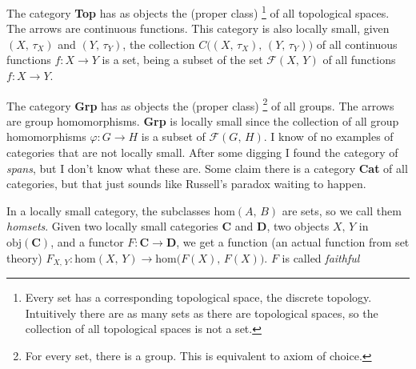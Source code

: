 \documentclass{article}
\theoremstyle{plain}
\theoremstyle{normal}
\newenvironment{example}{%
    \pushQED{\qed}\renewcommand{\qedsymbol}{$\blacksquare$}\examplex%
}{%
    \popQED\endexamplex%
}
\begin{document}
            \begin{example}
                The category \textbf{Top} has as objects the (proper class)%
                \footnote{%
                    Every set has a corresponding topological space, the
                    discrete topology. Intuitively there are as many sets as there
                    are topological spaces, so the collection of all topological
                    spaces is not a set.%
                }
                of all topological spaces. The arrows are continuous functions.
                This category is also locally small, given $(X,\,\tau_{X})$ and
                $(Y,\,\tau_{Y})$, the collection
                $C\big((X,\,\tau_{X}),\,(Y,\,\tau_{Y})\big)$ of all continuous
                functions $f:X\rightarrow{Y}$ is a set, being a subset of the set
                $\mathcal{F}(X,\,Y)$ of all functions $f:X\rightarrow{Y}$.
            \end{example}
            \begin{example}
                The category \textbf{Grp} has as objects the (proper class)%
                \footnote{%
                    For every set, there is a group. This is equivalent to axiom
                    of choice.%
                }
                of all groups. The arrows are group homomorphisms. \textbf{Grp} is
                locally small since the collection of all group homomorphisms
                $\varphi:G\rightarrow{H}$ is a subset of $\mathcal{F}(G,\,H)$.
            \end{example}
            I know of no examples of categories that are not locally small.
            After some digging I found the category of \textit{spans}, but I
            don't know what these are. Some claim there is a category
            \textbf{Cat} of all categories, but that just sounds like Russell's
            paradox waiting to happen.
            \par\hfill\par
            In a locally small category, the subclasses $\textrm{hom}(A,\,B)$
            are sets, so we call them \textit{homsets}.
            Given two locally small
            categories $\mathbf{C}$ and $\mathbf{D}$, two objects
            $X,\,Y$ in $\textrm{obj}(\mathbf{C})$, and a functor
            $F:\mathbf{C}\rightarrow\mathbf{D}$, we get a function
            (an actual function from set theory)
            $F_{X,\,Y}:\textrm{hom}(X,\,Y)\rightarrow\textrm{hom}\big(F(X),\,F(X)\big)$.
            $F$ is called \textit{faithful}%
\end{document}
